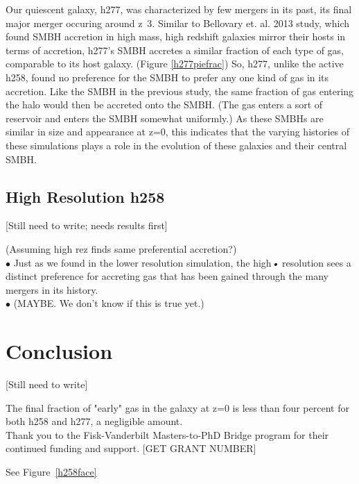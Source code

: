 \documentclass[manuscript]{aastex}
\begin{document}
	Our quiescent galaxy, h277, was characterized by few mergers in its past, its final major merger occuring around z~3. Similar to Bellovary et. al. 2013 study, which found SMBH accretion in high mass, high redshift galaxies mirror their hosts in terms of accretion, h277's SMBH accretes a similar fraction of each type of gas, comparable to its host galaxy. (Figure \ref{h277piefrac}) So, h277, unlike the active h258, found no preference for the SMBH to prefer any one kind of gas in its accretion. Like the SMBH in the previous study, the same fraction of gas entering the halo would then be accreted onto the SMBH. (The gas enters a sort of reservoir and enters the SMBH somewhat uniformly.)  As these SMBHs are similar in size and appearance at z=0, this indicates that the varying histories of these simulations plays a role in the evolution of these galaxies and their central SMBH.\\	
	

\subsection{High Resolution h258}

[Still need to write; needs results first]

(Assuming high rez finds same preferential accretion?)\\
$\bullet$ Just as we found in the lower resolution simulation, the high\textit{•} resolution sees a distinct preference for accreting gas that has been gained through the many mergers in its history. \\
$\bullet$ (MAYBE. We don't know if this is true yet.)\\


\section{Conclusion}

[Still need to write]

The final fraction of "early" gas in the galaxy at z=0 is less than four percent for both h258 and h277, a negligible amount.  \\


\acknowledgments
Thank you to the Fisk-Vanderbilt Masters-to-PhD Bridge program for their continued funding and support. [GET GRANT NUMBER]

See Figure~\ref{h258face}
\end{document}
